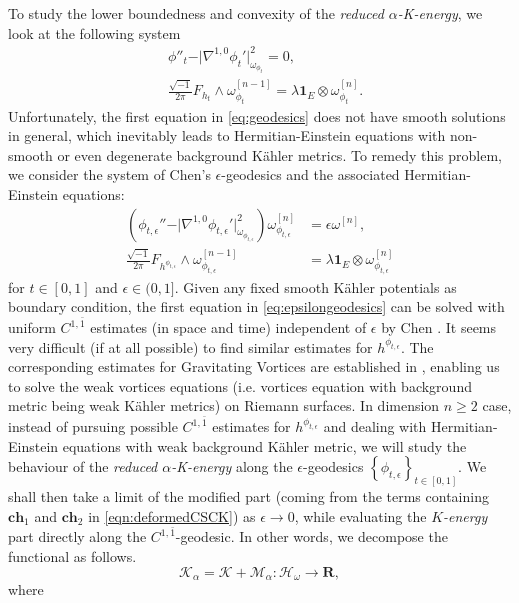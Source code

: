 \documentclass[10pt, letterpaper]{amsart}
\theoremstyle{plain}
\theoremstyle{definition}
\numberwithin{equation}{section}
\begin{document}
\indent To study the lower boundedness and convexity of the \emph{reduced $\alpha$-K-energy}, we look at the following system
\begin{equation}
\begin{split}
& \phi''_t-\vert \nabla^{1,0} \phi_t'\vert_{\omega_{\phi_t}}^2=0, \\
&\frac{\sqrt{-1}}{2\pi}F_{h_t}\wedge \omega_{\phi_t}^{[n-1]}=\lambda\mathbf{1}_E\otimes \omega_{\phi_t}^{[n]}.
\end{split}
\label{eq:geodesics}
\end{equation}
Unfortunately, the first equation in \eqref{eq:geodesics} does not have smooth solutions in general, which inevitably leads to Hermitian-Einstein equations with non-smooth or even degenerate background K\"ahler metrics.  To remedy this problem, we consider the system of Chen's $\epsilon$-geodesics and the associated Hermitian-Einstein equations:
\begin{equation}
\begin{split}
\left( \phi_{t,\epsilon}''-\vert \nabla^{1,0} \phi_{t, \epsilon}'\vert_{\omega_{\phi_{t,\epsilon}}}^2\right)\omega_{\phi_{t, \epsilon}}^{[n]}
& =\epsilon \omega^{[n]},\\
\frac{\sqrt{-1}}{2\pi}F_{h^{\phi_{t,\epsilon}}}\wedge \omega_{\phi_{t,\epsilon}}^{[n-1]}
& =\lambda\mathbf{1}_E\otimes \omega_{\phi_{t,\epsilon}}^{[n]}
\end{split}
\label{eq:epsilongeodesics}
\end{equation}
for $t\in [0,1]$ and $\epsilon\in (0,1]$. Given any fixed smooth K\"ahler potentials as boundary condition, the first equation in \eqref{eq:epsilongeodesics} can be solved with uniform $C^{1,\bar 1}$ estimates (in space and time) independent of $\epsilon$ by Chen \cite{XX1}. It seems very difficult (if at all possible) to find similar estimates for $h^{\phi_{t,\epsilon}}$. The corresponding estimates for Gravitating Vortices are established in \cite{AllGV}, enabling us to solve the weak vortices equations (i.e. vortices equation with background metric being weak K\"ahler metrics) on Riemann surfaces. In dimension $n\geq 2$ case, instead of pursuing possible $C^{1,\bar 1}$ estimates for $h^{\phi_{t,\epsilon}}$ and dealing with Hermitian-Einstein equations with weak background K\"ahler metric, we will study the behaviour of the \emph{reduced $\alpha$-K-energy} along the $\epsilon$-geodesics $\left\{\phi_{t,\epsilon}\right\}_{t\in [0,1]}$. We shall then take a limit of the modified part (coming from the terms containing $\mathbf{ch}_1$ and $\mathbf{ch}_2$ in \eqref{eqn:deformedCSCK}) as $\epsilon \to 0$,  while evaluating the \emph{$K$-energy} part directly along the $C^{1,\bar 1}$-geodesic. In other words, we decompose the functional as follows. 
\begin{equation}
    \mathcal{K}_\alpha 
    = 
    \mathcal{K}
    +
    \mathcal{M}_\alpha: \mathcal{H}_\omega\rightarrow \mathbf{R},
\end{equation}
where
\end{document}
